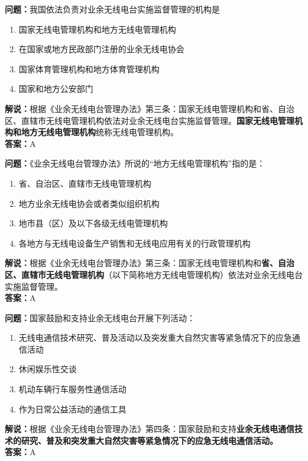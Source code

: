\textbf{问题：}我国依法负责对业余无线电台实施监督管理的机构是

\begin{enumerate}[label=\Alph*), leftmargin=1cm]
	\item 国家无线电管理机构和地方无线电管理机构
	\item 在国家或地方民政部门注册的业余无线电协会
	\item 国家体育管理机构和地方体育管理机构
	\item 国家和地方公安部门
\end{enumerate}

\textbf{解说：}根据《业余无线电台管理办法》第三条：国家无线电管理机构和省、自治区、直辖市无线电管理机构依法对业余无线电台实施监督管理。\textbf{国家无线电管理机构和地方无线电管理机构}统称无线电管理机构。\\\textbf{答案：}A

\textbf{问题：}《业余无线电台管理办法》所说的“地方无线电管理机构”指的是：

\begin{enumerate}[label=\Alph*), leftmargin=1cm]
	\item 省、自治区、直辖市无线电管理机构
	\item 地方业余无线电协会或者类似组织机构
	\item 地市县（区）及以下各级无线电管理机构
	\item 各地方与无线电设备生产销售和无线电应用有关的行政管理机构
\end{enumerate}

\textbf{解说：}根据《业余无线电台管理办法》第三条：国家无线电管理机构和\textbf{省、自治区、直辖市无线电管理机构}（以下简称地方无线电管理机构）依法对业余无线电台实施监督管理。\\\textbf{答案：}A

\textbf{问题：}国家鼓励和支持业余无线电台开展下列活动：

\begin{enumerate}[label=\Alph*), leftmargin=1cm]
	\item 无线电通信技术研究、普及活动以及突发重大自然灾害等紧急情况下的应急通信活动
	\item 休闲娱乐性交谈
	\item 机动车辆行车服务性通信活动
	\item 作为日常公益活动的通信工具
\end{enumerate}

\textbf{解说：}根据《业余无线电台管理办法》第四条：国家鼓励和支持\textbf{业余无线电通信技术的研究、普及和突发重大自然灾害等紧急情况下的应急无线电通信活动。}\\\textbf{答案：}A

